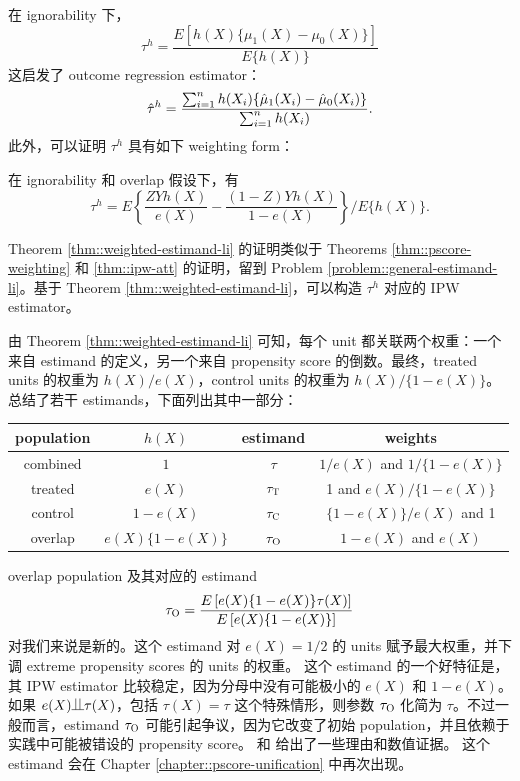在 ignorability 下，
$$
\tau^h =  \frac{  E[  h(X)   \{ \mu_1(X) - \mu_0(X) \}   ] }{ E\{ h(X)   \} }
$$
这启发了 outcome regression estimator：
$$
\hat \tau^h =  \frac{   \sum_{i=1}^n h(X_i)  \{ \hat{\mu}_1(X_i)   -  \hat{\mu}_0(X_i) \}  }{  \sum_{i=1}^n h(X_i) } .
$$
此外，可以证明 $\tau^h$ 具有如下 weighting form：

\begin{theorem}\label{thm::weighted-estimand-li}
在 ignorability 和 overlap 假设下，有
$$
\tau^h = E\left\{ \frac{ZYh(X)}{ e(X)}  - \frac{(1-Z)Yh(X)}{1-e(X)}  \right\} / E\{ h(X)   \} .
$$
\end{theorem}

Theorem \ref{thm::weighted-estimand-li} 的证明类似于 Theorems \ref{thm::pscore-weighting} 和 \ref{thm::ipw-att} 的证明，留到 Problem \ref{problem::general-estimand-li}。基于 Theorem \ref{thm::weighted-estimand-li}，可以构造 $\tau^h$ 对应的 IPW estimator。


由 Theorem \ref{thm::weighted-estimand-li} 可知，每个 unit 都关联两个权重：一个来自 estimand 的定义，另一个来自 propensity score 的倒数。最终，treated units 的权重为 $h(X) / e(X)$，control units 的权重为 $h(X)/ \{  1-e(X) \}$。\citet[][Table 1]{li2018balancing} 总结了若干 estimands，下面列出其中一部分：

\begin{tabular}{cccc}
\hline 
 population & $h(X)$ & estimand & weights \\ \hline 
combined & $1$ & $\tau$ & $1/e(X)$ and $1/\{  1-e(X) \} $  \\
treated & $e(X)$ & $\tau_\textsc{T}$ & 1 and $ e(X)/\{  1-e(X) \}$ \\
control & $1-e(X)$ & $\tau_\textsc{C}$ & $\{  1-e(X) \} /e(X) $ and 1\\
overlap & $e(X)\{  1-e(X) \} $ &$\tau_\textsc{O}$  &  $ 1-e(X)$ and $e(X) $ \\
\hline 
\end{tabular}


overlap population 及其对应的 estimand
$$
\tau_\textsc{O} = \frac{   E\left[ e(X)\{  1-e(X) \}   \tau(X) \right] }{   E\left[ e(X)\{  1-e(X) \}    \right] }
$$
对我们来说是新的。这个 estimand 对 $e(X) = 1/2$ 的 units 赋予最大权重，并下调 extreme propensity scores 的 units 的权重。
这个 estimand 的一个好特征是，其 IPW estimator 比较稳定，因为分母中没有可能极小的 $e(X)$ 和 $1-e(X) $。如果 $ e(X) \ind  \tau(X) $，包括 $\tau(X) = \tau$ 这个特殊情形，则参数 $\tau_\textsc{O} $ 化简为 $\tau$。不过一般而言，estimand $\tau_\textsc{O} $ 可能引起争议，因为它改变了初始 population，并且依赖于实践中可能被错设的 propensity score。\citet{li2018balancing} 和 \citet{li2019addressing} 给出了一些理由和数值证据。
这个 estimand 会在 Chapter \ref{chapter::pscore-unification} 中再次出现。


